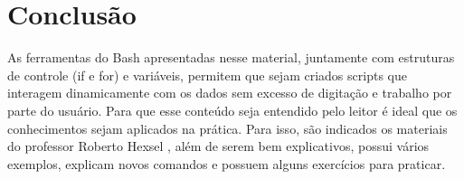 \documentclass[oneside, 11 pt]{article}
\begin{document}
	\section{Conclusão}
	As ferramentas do Bash apresentadas nesse material, juntamente com estruturas de controle (if e for) e variáveis, permitem que sejam criados scripts que interagem dinamicamente com os dados sem excesso de digitação e trabalho por parte do usuário. Para que esse conteúdo seja entendido pelo leitor é ideal que os conhecimentos sejam aplicados na prática. Para isso, são indicados os materiais do professor Roberto Hexsel \cite{roberto1, roberto2}, além de serem bem explicativos, possui vários exemplos, explicam novos comandos e possuem alguns exercícios para praticar.
	



\end{document}
